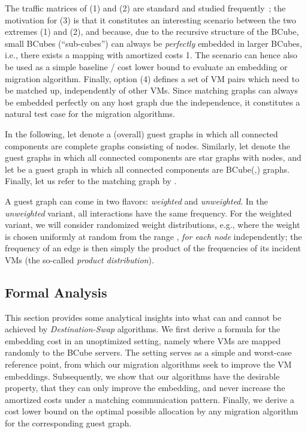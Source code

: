 \documentclass[conference]{IEEEtran}
\def\BC#1#2{BCube(#1,#2)}
\begin{document}
The traffic matrices of (1) and (2) are standard and studied frequently~\cite{podc11}; the motivation for (3) is that it constitutes an interesting scenario
between the two extremes (1) and (2), and because, due to the recursive structure of the BCube, small BCubes (``sub-cubes'') can always be \emph{perfectly} embedded
in larger BCubes, i.e., there exists a mapping with amortized costs 1. The scenario can hence also be used as a simple baseline / cost lower bound to evaluate an embedding or migration algorithm. Finally, option (4) defines a set of VM pairs which need to be matched up, independently of other VMs. Since matching graphs can always be embedded perfectly on any host graph due the independence, it constitutes a natural test case for the migration algorithms.

In the following, let  denote a (overall) guest graphs in which all connected components are complete graphs  consisting of  nodes. Similarly, let  denote the guest graphs in which all connected components are star graphs  with  nodes, and let  be a guest graph in which all connected components are \BC{}{} graphs. Finally, let us refer to the matching graph by .

A guest graph can come in two flavors: \emph{weighted} and \emph{unweighted}. In the \emph{unweighted} variant, all interactions have the same frequency.
For the weighted variant, we will consider randomized weight distributions, e.g., where the weight is chosen uniformly at random from the range , \emph{for each node} independently; the frequency of an edge is then simply the product of the frequencies of its incident VMs (the so-called \emph{product distribution}).

\subsection{Formal Analysis}

This section provides some analytical insights into what can and cannot be achieved by \emph{Destination-Swap} algorithms.
We first derive a formula for the embedding cost in an unoptimized setting, namely where VMs are mapped randomly to the
BCube servers. The setting serves as a simple and worst-case reference point, from which our migration algorithms
seek to improve the VM embeddings. Subsequently, we show that our algorithms have the desirable property, that
they can only improve the embedding, and never increase the amortized costs under a matching communication pattern. Finally, we derive a cost lower bound
on the optimal possible allocation by any migration algorithm for the corresponding guest graph.
\end{document}
